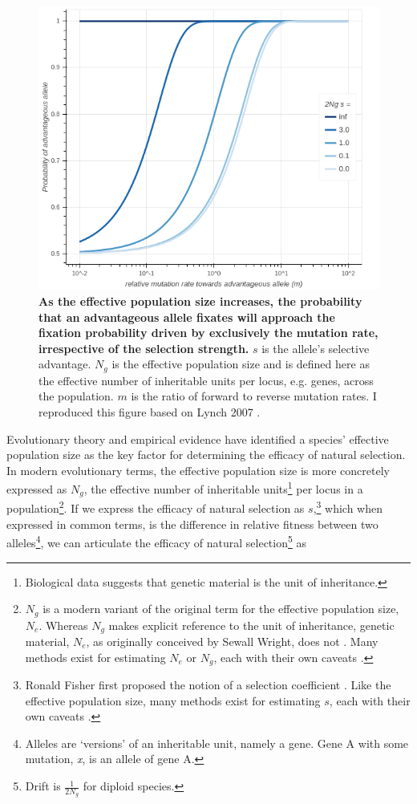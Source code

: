 \documentclass[twocolumn]{article}
\begin{document}
\begin{figure}[htp]
\centering
\includegraphics[width=10 cm]{fig_1.png}
\caption{\textbf{As the effective population size increases, the probability that an advantageous allele fixates will approach the fixation probability driven by exclusively the mutation rate, irrespective of the selection strength.} $s$ is the allele's selective advantage. $N_g$ is the effective population size and is defined here as the effective number of inheritable units per locus, e.g. genes, across the population. $m$ is the ratio of forward to reverse mutation rates. I reproduced this figure based on Lynch 2007 \cite{Lynch_2007}.}
\end{figure}

Evolutionary theory and empirical evidence have identified a species' effective population size as the key factor for determining the efficacy of natural selection. In modern evolutionary terms, the effective population size is more concretely expressed as $N_g$, the effective number of inheritable units\footnote{Biological data suggests that genetic material is the unit of inheritance.} per locus in a population\footnote{$N_g$ is a modern variant of the original term for the effective population size, $N_e$. Whereas $N_g$ makes explicit reference to the unit of inheritance, genetic material, $N_e$, as originally conceived by Sewall Wright, does not \cite{wright_1931}. Many methods exist for estimating $N_e$ or $N_g$, each with their own caveats \cite{wang_2016}.}. If we express the efficacy of natural selection as $s$,\footnote{Ronald Fisher first proposed the notion of a selection coefficient \cite{fisher_1930}. Like the effective population size, many methods exist for estimating $s$, each with their own caveats \cite{luis-miguel_2011}.} which when expressed in common terms, is the difference in relative fitness between two alleles\footnote{Alleles are `versions' of an inheritable unit, namely a gene. Gene A with some mutation, \textit{x}, is an allele of gene A.}, we can articulate the efficacy of natural selection\footnote{Drift is $\frac{1}{2N_g}$ for diploid species.} as
\end{document}
